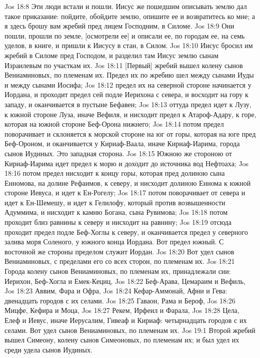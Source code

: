 \vs Jos 18:8 Эти люди встали и пошли. Иисус же пошедшим описывать землю дал такое приказание: пойдите, обойдите землю, опишите ее и возвратитесь ко мне; а я здесь брошу вам жребий пред лицем Господним, в Силоме.
\vs Jos 18:9 Они пошли, прошли по земле, [осмотрели ее] и описали ее, по городам ее, на семь уделов, в книге, и пришли к Иисусу в стан, в Силом.
\vs Jos 18:10 Иисус бросил им жребий в Силоме пред Господом, и разделил там Иисус землю сынам Израилевым по участкам их.
\rsbpar\vs Jos 18:11 [Первый] жребий вышел колену сынов Вениаминовых, по племенам их. Предел их по жребию шел между сынами Иуды и между сынами Иосифа;
\vs Jos 18:12 предел их на северной стороне начинается у Иордана, и проходит предел сей подле Иерихона с севера, и восходит на гору к западу, и оканчивается в пустыне Бефавен;
\vs Jos 18:13 оттуда предел идет к Лузу, к южной стороне Луза, иначе Вефиля, и нисходит предел к Атароф-Адару, к горе, которая на южной стороне Беф-Орона нижнего;
\vs Jos 18:14 потом предел поворачивает и склоняется к морской стороне на юг от горы, которая на юге пред Беф-Ороном, и оканчивается у Кириаф-Ваала, иначе Кириаф-Иарима, города сынов Иудиных. Это западная сторона.
\vs Jos 18:15 Южною же стороною от Кириаф-Иарима идет предел к морю и доходит до источника вод Нефтоаха;
\vs Jos 18:16 потом предел нисходит к концу горы, которая пред долиною сына Енномова, на долине Рефаимов, к северу, и нисходит долиною Еннома к южной стороне Иевуса, и идет к Ен-Рогелу;
\vs Jos 18:17 потом поворачивает от севера и идет к Ен-Шемешу, и идет к Гелилофу, который против возвышенности Адуммима, и нисходит к камню Богана, сына Рувимова;
\vs Jos 18:18 потом проходит близ равнины к северу и нисходит на равнину;
\vs Jos 18:19 отсюда проходит предел подле Беф-Хоглы к северу, и оканчивается предел у северного залива моря Соленого, у южного конца Иордана. Вот предел южный. С восточной же стороны пределом служит Иордан.
\vs Jos 18:20 Вот удел сынов Вениаминовых, с пределами его со всех сторон, по племенам их.
\vs Jos 18:21 Города колену сынов Вениаминовых, по племенам их, принадлежали сии: Иерихон, Беф-Хогла и Емек-Кециц,
\vs Jos 18:22 Беф-Арава, Цемараим и Вефиль,
\vs Jos 18:23 Аввим, Фара и Офра,
\vs Jos 18:24 Кефар-Аммонай, Афни и Гева: двенадцать городов с их селами.
\vs Jos 18:25 Гаваон, Рама и Бероф,
\vs Jos 18:26 Мицфе, Кефира и Моца,
\vs Jos 18:27 Рекем, Ирфеил и Фарала,
\vs Jos 18:28 Цела, Елеф и Иевус, иначе Иерусалим, Гивеаф и Кириаф: четырнадцать городов с их селами. Вот удел сынов Вениаминовых, по племенам их.
\vs Jos 19:1 Второй жребий вышел Симеону, колену сынов Симеоновых, по племенам их; и был удел их среди удела сынов Иудиных.
